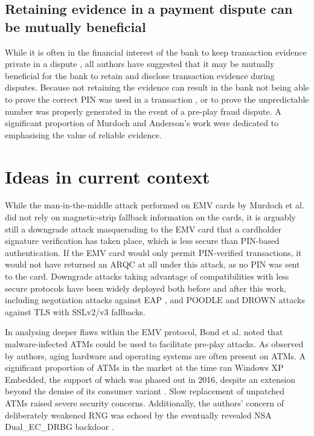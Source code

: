 \documentclass[11pt]{article}
\begin{document}
\subsection{Retaining evidence in a payment dispute can be mutually beneficial}

While it is often in the financial interest of the bank to keep transaction evidence private in a dispute \cite[Sec. VII]{murdoch2010chip} \cite[VIII. A.]{bond2014chip}, all authors have suggested that it may be mutually beneficial for the bank to retain and disclose transaction evidence during disputes. Because not retaining the evidence can result in the bank not being able to prove the correct PIN was used in a transaction \cite[p. 441]{murdoch2010chip}, or to prove the unpredictable number was properly generated in the event of a pre-play fraud dispute. A significant proportion of Murdoch and Anderson's work \cite[Sec. 3]{murdoch2014security} were dedicated to emphasising the value of reliable evidence.
 
\section{Ideas in current context}

While the man-in-the-middle attack performed on EMV cards by Murdoch et al. \cite[p. 442]{murdoch2010chip} did not rely on magnetic-strip fallback information on the cards, it is arguably still a downgrade attack masquerading to the EMV card that a cardholder signature verification has taken place, which is less secure than PIN-based authentication. If the EMV card would only permit PIN-verified transactions, it would not have returned an ARQC at all under this attack, as no PIN was sent to the card. Downgrade attacks taking advantage of compatibilities with less secure protocols have been widely deployed both before and after this work, including negotiation attacks against EAP \cite{aboba2004extensible}, and POODLE \cite{moller2014poodle} and DROWN \cite{aviram2016drown} attacks against TLS with SSLv2/v3 fallbacks.

In analysing deeper flaws within the EMV protocol, Bond et al. \cite[Sec. VI]{bond2014chip} noted that malware-infected ATMs could be used to facilitate pre-play attacks. As observed by authors, aging hardware and operating systems are often present on ATMs. A significant proportion of ATMs in the market at the time ran Windows XP Embedded, the support of which was phased out in 2016, despite an extension beyond the demise of its consumer variant \cite{atmxp}. Slow replacement of unpatched ATMs raised severe security concerns. Additionally, the authors' concern of deliberately weakened RNG was echoed by the eventually revealed NSA Dual\_EC\_DRBG backdoor \cite{checkoway2014practical}.
\end{document}
